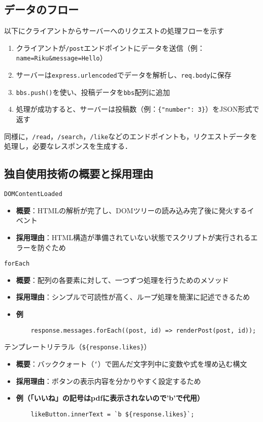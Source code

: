 \documentclass[uplatex,dvipdfmx]{jsarticle}
\begin{document}
\subsection{データのフロー}
以下にクライアントからサーバーへのリクエストの処理フローを示す

\begin{enumerate}
    \item クライアントが\texttt{/post}エンドポイントにデータを送信（例：\texttt{name=Riku\&message=Hello}）
    \item サーバーは\texttt{express.urlencoded}でデータを解析し、\texttt{req.body}に保存
    \item \texttt{bbs.push()}を使い、投稿データを\texttt{bbs}配列に追加
    \item 処理が成功すると、サーバーは投稿数（例：\texttt{\{"number": 3\}}）をJSON形式で返す
\end{enumerate}

同様に，\texttt{/read}，\texttt{/search}，\texttt{/like}などのエンドポイントも，リクエストデータを処理し，必要なレスポンスを生成する．

\subsection{独自使用技術の概要と採用理由}
\texttt{DOMContentLoaded}
\begin{itemize}
    \item \textbf{概要}：HTMLの解析が完了し、DOMツリーの読み込み完了後に発火するイベント
    \item \textbf{採用理由}：HTML構造が準備されていない状態でスクリプトが実行されるエラーを防ぐため
\end{itemize}

\texttt{forEach}
\begin{itemize}
    \item \textbf{概要}：配列の各要素に対して、一つずつ処理を行うためのメソッド
    \item \textbf{採用理由}：シンプルで可読性が高く、ループ処理を簡潔に記述できるため
    \item \textbf{例}
    \begin{verbatim}
    response.messages.forEach((post, id) => renderPost(post, id));
    \end{verbatim}
\end{itemize}

テンプレートリテラル（\texttt{\$\{response.likes\}}）
\begin{itemize}
    \item \textbf{概要}：バッククォート（\texttt{`}）で囲んだ文字列中に変数や式を埋め込む構文
    \item \textbf{採用理由}：ボタンの表示内容を分かりやすく設定するため
    \item \textbf{例（「いいね」の記号はpdfに表示されないので'b'で代用）}
    \begin{verbatim}
    likeButton.innerText = `b ${response.likes}`;
    \end{verbatim}
\end{itemize}
\end{document}
